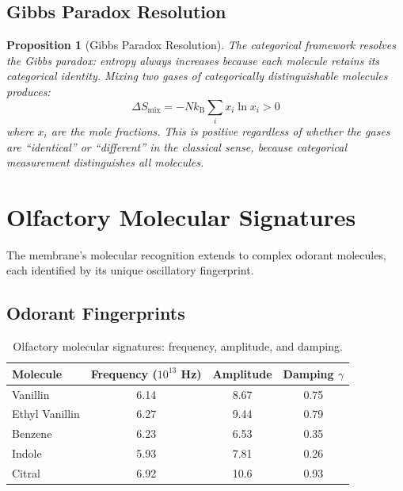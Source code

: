\documentclass[12pt]{article}
\newtheorem{proposition}[theorem]{Proposition}
\theoremstyle{definition}
\theoremstyle{remark}
\newcommand{\kB}{k_{\mathrm{B}}}
\begin{document}
\subsection{Gibbs Paradox Resolution}

\begin{proposition}[Gibbs Paradox Resolution]
\label{prop:gibbs}
The categorical framework resolves the Gibbs paradox: entropy always increases because each molecule retains its categorical identity. Mixing two gases of categorically distinguishable molecules produces:
\begin{equation}
\label{eq:gibbs}
\Delta S_{\mathrm{mix}} = -N \kB \sum_i x_i \ln x_i > 0
\end{equation}
where $x_i$ are the mole fractions. This is positive regardless of whether the gases are ``identical'' or ``different'' in the classical sense, because categorical measurement distinguishes all molecules.
\end{proposition}


\section{Olfactory Molecular Signatures}
\label{sec:olfactory}

The membrane's molecular recognition extends to complex odorant molecules, each identified by its unique oscillatory fingerprint.

\subsection{Odorant Fingerprints}

\begin{table}[H]
\centering
\caption{Olfactory molecular signatures: frequency, amplitude, and damping.}
\label{tab:olfactory}
\begin{tabular}{@{}lccc@{}}
\toprule
Molecule & Frequency ($10^{13}$ Hz) & Amplitude & Damping $\gamma$ \\
\midrule
Vanillin & 6.14 & 8.67 & 0.75 \\
Ethyl Vanillin & 6.27 & 9.44 & 0.79 \\
Benzene & 6.23 & 6.53 & 0.35 \\
Indole & 5.93 & 7.81 & 0.26 \\
Citral & 6.92 & 10.6 & 0.93 \\
\bottomrule
\end{tabular}
\end{table}
\end{document}
